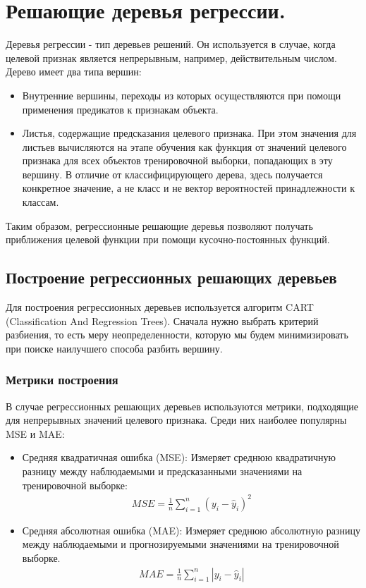 \section{Решающие деревья регрессии.}

Деревья регрессии - тип деревьев решений. Он используется в случае, когда целевой признак является непрерывным, например, действительным числом. Дерево имеет два типа вершин:
\begin{itemize}
    \item Внутренние вершины, переходы из которых осуществляются при помощи применения предикатов к признакам объекта.
    \item Листья, содержащие предсказания целевого признака. При этом значения для листьев вычисляются на этапе обучения как функция от значений целевого признака для всех объектов тренировочной выборки, попадающих в эту вершину. В отличие от классифицирующего дерева, здесь получается конкретное значение, а не класс и не вектор вероятностей принадлежности к классам.
\end{itemize}
Таким образом, регрессионные решающие деревья позволяют получать приближения целевой функции при помощи кусочно-постоянных функций.

\subsection{Построение регрессионных решающих деревьев}
Для построения регрессионных деревьев используется алгоритм CART (Classification And Regression Trees). Сначала нужно выбрать критерий разбиения, то есть меру неопределенности, которую мы будем минимизировать при поиске наилучшего способа разбить вершину.

\subsubsection{Метрики построения}
В случае регрессионных решающих деревьев используются метрики, подходящие для непрерывных значений целевого признака. Среди них наиболее популярны MSE и MAE:
\begin{itemize}
    \item  Средняя квадратичная ошибка (MSE): Измеряет среднюю квадратичную разницу между наблюдаемыми и предсказанными значениями на тренировочной выборке:
    \begin{align*}
        MSE = \frac{1}{n} \sum_{i=1}^{n} (y_i - \hat{y}_i)^2
    \end{align*} 
    \item Средняя абсолютная ошибка (MAE): Измеряет среднюю абсолютную разницу между наблюдаемыми и прогнозируемыми значениями на тренировочной выборке.
    \begin{align*}
        MAE = \frac{1}{n} \sum_{i=1}^{n} |y_i - \hat{y}_i|
    \end{align*}
\end{itemize}

